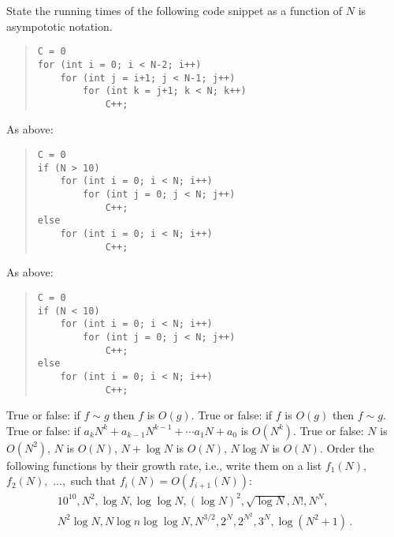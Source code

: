 \documentclass{tufte-handout}
\begin{document}
\begin{ExerciseList}
  \Exercise State the running times of the following code snippet as
  a function of $N$ is asympototic notation.
  \begin{quote}
\begin{lstlisting}[basicstyle=\ttfamily\small]
C = 0
for (int i = 0; i < N-2; i++)
    for (int j = i+1; j < N-1; j++)
        for (int k = j+1; k < N; k++)
            C++;
\end{lstlisting}
\end{quote} 

  \Exercise As above:
  \begin{quote}
\begin{lstlisting}[basicstyle=\ttfamily\small]
C = 0
if (N > 10)
    for (int i = 0; i < N; i++)
        for (int j = 0; j < N; j++)
            C++;
else 
    for (int i = 0; i < N; i++)
            C++;
\end{lstlisting}
\end{quote} 

  \Exercise As above:
  \begin{quote}
\begin{lstlisting}[basicstyle=\ttfamily\small]
C = 0
if (N < 10)
    for (int i = 0; i < N; i++)
        for (int j = 0; j < N; j++)
            C++;
else 
    for (int i = 0; i < N; i++)
            C++;
\end{lstlisting}
\end{quote} 

\Exercise True or false: if $f\sim g$ then $f$ is $O(g)$.
\Exercise True or false: if $f$ is $O(g)$ then $f\sim g$.
\Exercise True or false: if $a_kN^k +a_{k-1}N^{k-1} + \cdots a_1 N +
a_0$ is $O(N^k)$.
\Exercise True or false: $N$ is $O(N^2)$, $N$ is $O(N)$, $N+\log
N $ is $O(N)$, $N\log N $ is $O(N)$. \Exercise Order the following
functions by their growth rate, i.e., write them on a list $f_1(N),$
$f_2(N),$ $\ldots,$ such that $f_i(N)=O(f_{i+1}(N))$:
    \begin{multline*}
      10^{10}, N^2, \log N, \log\log N, (\log N)^2, \sqrt{\log N}, N!,
      N^N,\\ N^2\log N, N\log n\log\log N, N^{3/2}, 2^N, 2^{N^2}, 3^N,
      \log (N^2+1)\,.
    \end{multline*}
\end{ExerciseList}
\end{document}
